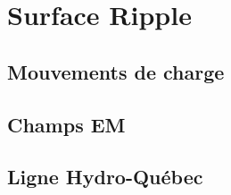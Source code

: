 
\section{Surface Ripple}
\subsection{Mouvements de charge}

\subsection{Champs EM}

\subsection{Ligne Hydro-Québec}
